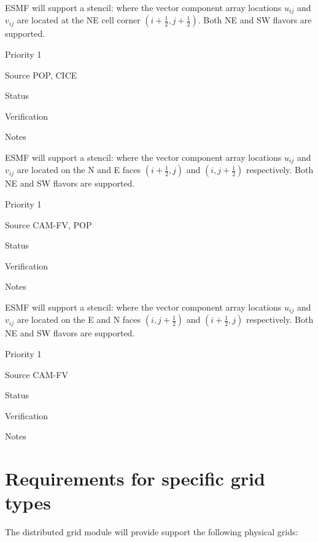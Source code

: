\sreq{\bgrid}

ESMF will support a \bgrid stencil: where the vector component array
locations $u_{ij}$ and $v_{ij}$ are located at the NE cell corner
$(i+\frac12,j+\frac12)$. Both NE and SW flavors are supported.

\begin{reqlist}
\item[Priority] 1
\item[Source] POP, CICE
\item[Status]
\item[Verification]
\item[Notes]
\end{reqlist}

\sreq{\cgrid}

ESMF will support a \cgrid stencil: where the vector component array
locations $u_{ij}$ and $v_{ij}$ are located on the N and E faces
$(i+\frac12,j)$ and $(i,j+\frac12)$ respectively. Both NE and SW
flavors are supported.

\begin{reqlist}
\item[Priority] 1
\item[Source] CAM-FV, POP
\item[Status]
\item[Verification]
\item[Notes]
\end{reqlist}

\sreq{\dgrid}

ESMF will support a \dgrid stencil: where the vector component array
locations $u_{ij}$ and $v_{ij}$ are located on the E and N faces
$(i,j+\frac12)$ and $(i+\frac12,j)$ respectively. Both NE and SW
flavors are supported.

\begin{reqlist}
\item[Priority] 1
\item[Source] CAM-FV
\item[Status]
\item[Verification]
\item[Notes]
\end{reqlist}

\part{Requirements for specific grid types} \label{DG:gridtypes}

The distributed grid module will provide support the following 
physical grids:

